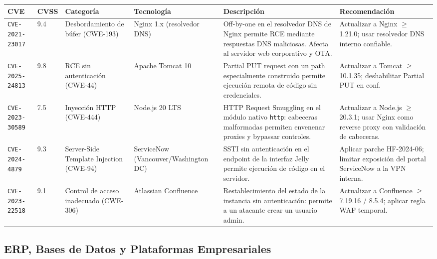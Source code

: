 \documentclass[letterpaper,11pt]{article}
\begin{document}
\begingroup\footnotesize
{}
\begin{tabular}{|p{2.3cm}|p{0.65cm}|p{1.9cm}|p{2.0cm}|p{3.9cm}|p{3.0cm}|}
\hline
\rowcolor{green!22}
\textbf{CVE} & \textbf{CVSS} & \textbf{Categoría} & \textbf{Tecnología} & \textbf{Descripción} & \textbf{Recomendación} \\
\hline
\texttt{CVE-2021-23017} & 9.4 & Desbordamiento de búfer (CWE-193) & Nginx 1.x (resolvedor DNS) & Off-by-one en el resolvedor DNS de Nginx permite RCE mediante respuestas DNS maliciosas. Afecta al servidor web corporativo y OTA. & Actualizar a Nginx $\geq$ 1.21.0; usar resolvedor DNS interno confiable. \\
\hline
\texttt{CVE-2025-24813} & 9.8 & RCE sin autenticación (CWE-44) & Apache Tomcat 10 & Partial PUT request con un path especialmente construido permite ejecución remota de código sin credenciales. & Actualizar a Tomcat $\geq$ 10.1.35; deshabilitar Partial PUT en conf. \\
\hline
\texttt{CVE-2023-30589} & 7.5 & Inyección HTTP (CWE-444) & Node.js 20 LTS & HTTP Request Smuggling en el módulo nativo \texttt{http}: cabeceras malformadas permiten envenenar proxies y bypassar controles. & Actualizar a Node.js $\geq$ 20.3.1; usar Nginx como reverse proxy con validación de cabeceras. \\
\hline
\texttt{CVE-2024-4879} & 9.3 & Server-Side Template Injection (CWE-94) & ServiceNow (Vancouver/Washington DC) & SSTI sin autenticación en el endpoint de la interfaz Jelly permite ejecución de código en el servidor. & Aplicar parche HF-2024-06; limitar exposición del portal ServiceNow a la VPN interna. \\
\hline
\texttt{CVE-2023-22518} & 9.1 & Control de acceso inadecuado (CWE-306) & Atlassian Confluence & Restablecimiento del estado de la instancia sin autenticación: permite a un atacante crear un usuario admin. & Actualizar a Confluence $\geq$ 7.19.16 / 8.5.4; aplicar regla WAF temporal. \\
\hline
\end{tabular}
\endgroup

\subsection{ERP, Bases de Datos y Plataformas Empresariales}
\end{document}
